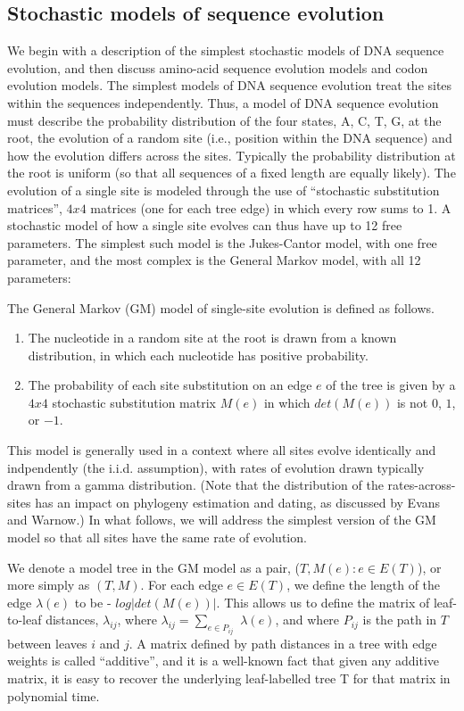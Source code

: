 \subsection{Stochastic models of sequence evolution}
We begin with a description of the simplest stochastic models of DNA sequence 
evolution, and then discuss amino-acid sequence evolution models and codon evolution models.
The simplest models of DNA sequence evolution treat the sites within the sequences 
independently. Thus, a model of DNA sequence evolution must describe the probability
distribution of the four states, A, C, T, G, at the root, the evolution of a random site (i.e.,
position within the DNA sequence) and how the evolution differs across the sites. 
Typically the probability distribution at the root is uniform (so that all sequences of a fixed
length are equally likely). The evolution of a single site is modeled through the use of
``stochastic substitution matrices'', $4 x 4$ matrices (one for each tree edge) in which every
row sums to 1. A stochastic model of how a single site evolves can thus have up to 12 free
parameters. The simplest such model is the Jukes-Cantor model, with one free parameter,
and the most complex is the General Markov model, with all 12 parameters:

\begin{defn}
The General Markov (GM) model of single-site evolution is defined as follows.

\begin{enumerate}
	\item The nucleotide in a random site at the root is drawn from a known distribution, in
which each nucleotide has positive probability.
	\item The probability of each site substitution on an edge $e$ of the tree is given by a $4 x 4$
stochastic substitution matrix $M(e)$ in which $det(M(e))$ is not $0$, $1$, or $-1$.	
\end{enumerate}
\end{defn}

This model is generally used in a context where all sites evolve identically and 
indpendently (the i.i.d. assumption), with rates of evolution drawn typically drawn from a
gamma distribution. (Note that the distribution of the rates-across-sites has an impact
on phylogeny estimation and dating, as discussed by Evans and Warnow.) In what
follows, we will address the simplest version of the GM model so that all sites have the
same rate of evolution.

We denote a model tree in the GM model as a pair, ($T, {M(e): e \in E(T)}$), or more
simply as $(T, M)$. For each edge $e \in E(T)$, we define the length of the edge $\lambda(e)$ to
be - $log |det(M(e))|$. This allows us to define the matrix of leaf-to-leaf distances, ${\lambda_{ij}}$,
where $\lambda_{ij} = \sum_{e \in P_{ij}}$
$\lambda(e)$, and where $P_{ij}$ is the path in $T$ between leaves $i$ and $j$. A
matrix defined by path distances in a tree with edge weights is called ``additive'', and it
is a well-known fact that given any additive matrix, it is easy to recover the underlying
leaf-labelled tree T for that matrix in polynomial time.


